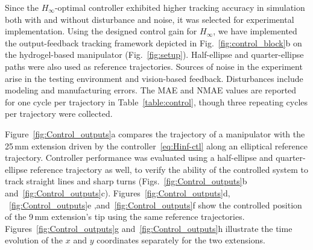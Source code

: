 Since the $H_\infty$-optimal controller exhibited higher tracking accuracy in simulation both with and without disturbance and noise, it was selected for experimental implementation. Using the designed control gain for $H_\infty$, we have implemented the output-feedback tracking framework depicted in Fig.~\ref{fig:control_block}b on the hydrogel-based manipulator (Fig.~\ref{fig:setup}). Half-ellipse and quarter-ellipse paths were also used as reference trajectories. Sources of noise in the experiment arise in the testing environment and vision-based feedback. Disturbances include modeling and manufacturing errors.  The MAE and NMAE values are reported for one cycle per trajectory in Table~\ref{table:control}, though three repeating cycles per trajectory were collected.

Figure~\ref{fig:Control_outputs}a compares the trajectory of a manipulator with the 25\,mm extension driven by the controller~\eqref{eq:Hinf-ctl} along an elliptical reference trajectory. Controller performance was evaluated using a half-ellipse and quarter-ellipse reference trajectory as well, to verify the ability of the controlled system to track straight lines and sharp turns (Figs.~\ref{fig:Control_outputs}b and~\ref{fig:Control_outputs}c). Figures~\ref{fig:Control_outputs}d, ~\ref{fig:Control_outputs}e ,and~\ref{fig:Control_outputs}f show the controlled position of the 9\,mm extension's tip using the same reference trajectories. Figures~\ref{fig:Control_outputs}g and~\ref{fig:Control_outputs}h illustrate the time evolution of the $x$ and $y$ coordinates separately for the two extensions.

